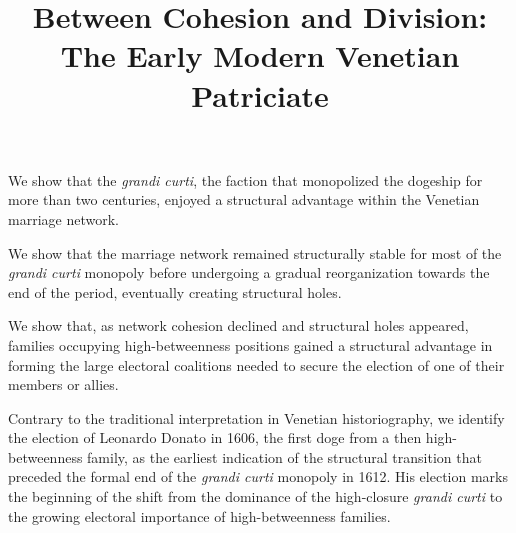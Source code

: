 \documentclass[authoryear,preprint,12pt]{elsarticle}
\begin{document}
\begin{frontmatter}



\title{Between Cohesion and Division: The Early Modern Venetian Patriciate} %


\begin{highlights}
\item We show that the \emph{grandi curti}, the faction that monopolized the dogeship for more than two centuries, enjoyed a structural advantage within the Venetian marriage network.
\item We show that the marriage network remained structurally stable for most of the \emph{grandi curti} monopoly before undergoing a gradual reorganization towards the end of the period, eventually creating structural holes.
\item We show that, as network cohesion declined and structural holes appeared, families occupying high-betweenness positions gained a structural advantage in forming the large electoral coalitions needed to secure the election of one of their members or allies.
\item Contrary to the traditional interpretation in Venetian historiography, we identify the election of Leonardo Donato in 1606, the first doge from a then high-betweenness family, as the earliest indication of the structural transition that preceded the formal end of the \emph{grandi curti} monopoly in 1612. His election marks the beginning of the shift from the dominance of the high-closure \emph{grandi curti} to the growing electoral importance of high-betweenness families.
\end{highlights}


\end{frontmatter}
\end{document}
